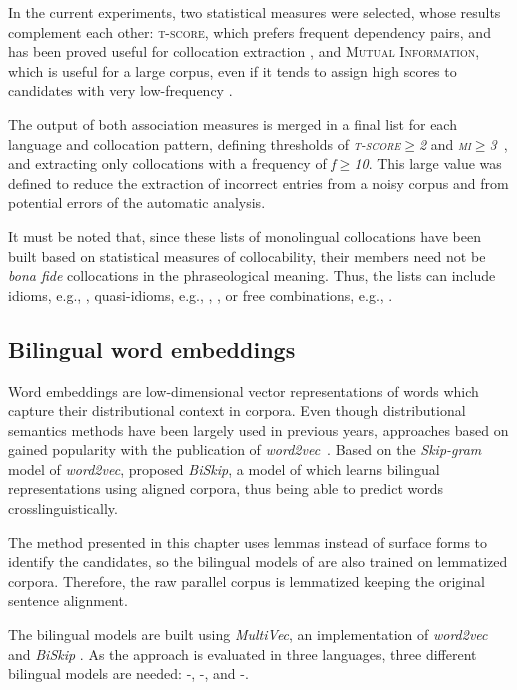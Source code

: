 \documentclass[output=paper,modfonts,nonflat]{langsci/langscibook}
\begin{document}
In the current experiments, two statistical measures were selected, whose results
complement each other: \textsc{t-score}, which prefers frequent dependency pairs,
and has been proved useful for collocation extraction \citep{krenn2001}, and
\textsc{Mutual Information}, which is useful for a large corpus, even if it
tends to assign high scores to candidates with very low-frequency \citep{pecina2010lexical}.

The output of both association measures is merged in a final list for each
language and collocation pattern, defining thresholds of \emph{\textsc{t-score$\geq$2}} and
\emph{\textsc{mi}$\geq$3}~\citep{stubbs1995}, and extracting only collocations with a frequency
of \emph{f$\geq$10}. This large value was defined to reduce the extraction of incorrect
entries from a noisy corpus and from potential errors of the automatic analysis.

It must be noted that, since these lists of monolingual collocations have been built
based on statistical measures of collocability, their members need not be
\emph{bona fide} collocations in the phraseological meaning. Thus, the lists can include
idioms, e.g., , quasi-idioms, e.g., , \citep{melcuk98}, or free combinations, e.g., .

%
\subsection{Bilingual word embeddings}
\label{garcia:sec:models}
Word embeddings are low-dimensional vector representations of words which
capture their distributional context in corpora. Even though distributional
semantics methods have been largely used in previous years, approaches based
on  gained popularity with the publication of \emph{word2vec}~\citep{mikolov2013}.
Based on the \emph{Skip-gram} model of \emph{word2vec}, \citet{bivec} proposed
\emph{BiSkip}, a model of  which learns bilingual representations
using aligned corpora, thus being able to predict words crosslinguistically.

The method presented in this chapter uses lemmas instead of surface forms to identify the
 candidates, so the bilingual models of  are also trained on
lemmatized corpora. Therefore, the raw parallel corpus is lemmatized keeping the original sentence alignment.

The bilingual models are built 
using \emph{MultiVec},
an implementation of \emph{word2vec} and \emph{BiSkip} \citep{MultiVec}. As the approach
is evaluated in three languages, three different bilingual models are needed:
-, -, and -.
\end{document}
